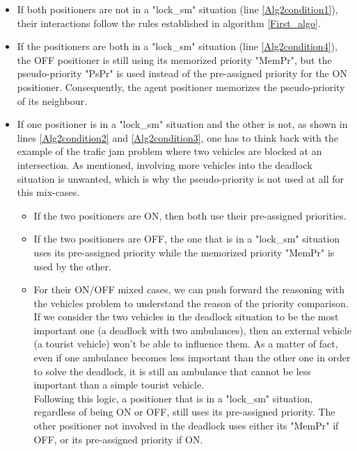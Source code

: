 \documentclass[]{spie}  %
\begin{document}
\begin{itemize}
\item If both positioners are not in a "lock\_sm" situation (line \ref{Alg2condition1}), their interactions follow the rules established in algorithm \ref{First_algo}.\\
\item If the positioners are both in a "lock\_sm" situation (line \ref{Alg2condition4}), the OFF positioner is still using its memorized priority "MemPr", but the pseudo-priority "PsPr" is used instead of the pre-assigned priority for the ON positioner. Consequently, the agent positioner memorizes the pseudo-priority of its neighbour.\\
\item If one positioner is in a "lock\_sm" situation and the other is not, as shown in lines \ref{Alg2condition2} and \ref{Alg2condition3}, one has to think back with the example of the trafic jam problem where two vehicles are blocked at an intersection. As mentioned, involving more vehicles into the deadlock situation is unwanted, which is why the pseudo-priority is not used at all for this mix-cases.
\begin{itemize}
\item If the two positioners are ON, then both use their pre-assigned priorities.\\
\item If the two positioners are OFF, the one that is in a "lock\_sm" situation uses its pre-assigned priority while the memorized priority "MemPr" is used by the other.\\  
\item For their ON/OFF mixed cases, we can push forward the reasoning with the vehicles problem to understand the reason of the priority comparison.\\ 
If we consider the two vehicles in the deadlock situation to be the most important one (a deadlock with two ambulances), then an external vehicle (a tourist vehicle) won't be able to influence them. As a matter of fact, even if one ambulance becomes less important than the other one in order to solve the deadlock, it is still an ambulance that cannot be less important than a simple tourist vehicle.\\
Following this logic, a positioner that is in a "lock\_sm" situation, regardless of being ON or OFF, still uses its pre-assigned priority. The other positioner not involved in the deadlock uses either its "MemPr" if OFF, or its pre-assigned priority if ON. 

\end{itemize}
\end{itemize}	
\end{document}
